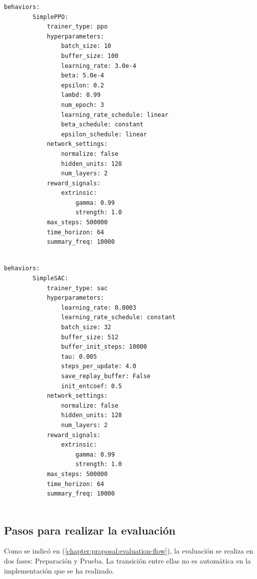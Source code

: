 \vspace*{1cm}
 
\begin{lstlisting}[caption={Configuración de hiperparámetros para el agente con el algoritmo PPO}]
    behaviors:
        SimplePPO:
            trainer_type: ppo
            hyperparameters:
                batch_size: 10
                buffer_size: 100
                learning_rate: 3.0e-4
                beta: 5.0e-4
                epsilon: 0.2
                lambd: 0.99
                num_epoch: 3
                learning_rate_schedule: linear
                beta_schedule: constant
                epsilon_schedule: linear
            network_settings:
                normalize: false
                hidden_units: 128
                num_layers: 2
            reward_signals:
                extrinsic:
                    gamma: 0.99
                    strength: 1.0
            max_steps: 500000
            time_horizon: 64
            summary_freq: 10000
 
\end{lstlisting}
 
\vspace*{1cm}
 
\begin{lstlisting}[caption={Configuración de hiperparámetros para el agente con el algoritmo SAC}]
    behaviors:
        SimpleSAC:
            trainer_type: sac
            hyperparameters:
                learning_rate: 0.0003
                learning_rate_schedule: constant
                batch_size: 32
                buffer_size: 512
                buffer_init_steps: 10000
                tau: 0.005
                steps_per_update: 4.0
                save_replay_buffer: False
                init_entcoef: 0.5
            network_settings:
                normalize: false
                hidden_units: 128
                num_layers: 2
            reward_signals:
                extrinsic:
                    gamma: 0.99
                    strength: 1.0
            max_steps: 500000
            time_horizon: 64
            summary_freq: 10000
 
\end{lstlisting}
 
\subsection{Pasos para realizar la evaluación}
 
Como se indicó en (\ref{chapter:proposal:evaluation-flow}), la evaluación se realiza en dos fases: Preparación y Prueba. La transición entre ellas no es automática en la implementación que se ha realizado. 
 
